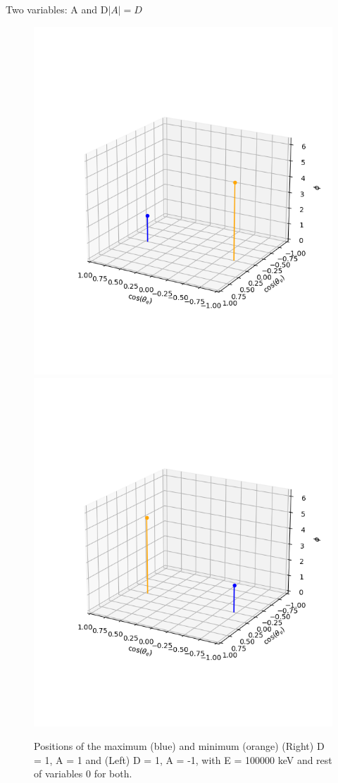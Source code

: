 \documentclass{beamer}
\begin{document}
\begin{frame}{Two variables: A and D}{$|A|= D$}
	\begin{figure}
		\centering
		\includegraphics[width=0.4\paperwidth]{plots/posD_eqposA_max_min}
		\includegraphics[width=0.4\paperwidth]{plots/posD_eqnegA_max_min}
		\caption{Positions of the maximum (blue) and minimum (orange) (Right) D = 1, A = 1 and (Left) D = 1, A = -1, with E = 100000 keV and rest of variables 0 for both.}
	\end{figure}
\end{frame}
\end{document}
